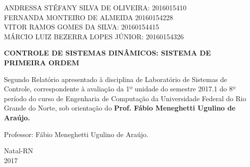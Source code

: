 \documentclass[a4paper,12pt]{article}
\begin{document}
\newpage


\thispagestyle{empty}

\begin{center}
\begin{normalsize}
ANDRESSA STÉFANY SILVA DE OLIVEIRA: 2016015410\\
\vspace{0.8cm}
FERNANDA MONTEIRO DE ALMEIDA 20160154228\\
\vspace{0.8cm}
VITOR RAMOS GOMES DA SILVA: 20160154415\\
\vspace{0.8cm}
MÁRCIO LUIZ BEZERRA LOPES JÚNIOR: 20160154326\\

\end{normalsize}
\end{center}
\vspace{3cm}

{\bf{\large {\centering CONTROLE DE SISTEMAS DINÂMICOS: SISTEMA DE PRIMEIRA ORDEM\\}}}

\vspace{4cm}

\begin{adjustwidth}{7.5cm}{0cm}

{\normalsize

Segundo Relatório apresentado à disciplina de
Laboratório de Sistemas de Controle, correspondente à
avaliação da 1º unidade do semestre 2017.1 do 8º período
do curso de Engenharia de Computação da
Universidade Federal do Rio Grande do Norte, sob
orientação do {\bf Prof. Fábio Meneghetti Ugulino de
Araújo.}

}

\end{adjustwidth}

\vspace{2cm}

\begin{center}

Professor:  Fábio Meneghetti Ugulino de Araújo.

\vspace{2.5cm}

{\large Natal-RN\\
2017}

\end{center}

\newpage
\end{document}
